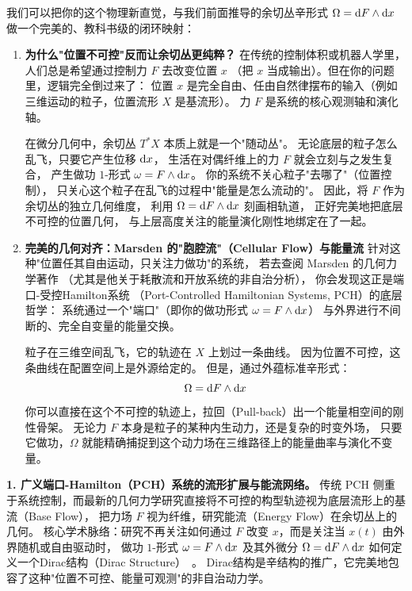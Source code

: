 ﻿\documentclass[10pt,a4paper]{article}
\numberwithin{equation}{section}
\begin{document}
\begin{framed}
我们可以把你的这个物理新直觉，与我们前面推导的余切丛辛形式
$\Omega = \text dF \wedge \text dx$ 做一个完美的、教科书级的闭环映射：

\begin{enumerate}
  \item \textbf{为什么"位置不可控"反而让余切丛更纯粹？}
  在传统的控制体积或机器人学里，人们总是希望通过控制力 $F$ 去改变位置 $x$
  （把 $x$ 当成输出）。但在你的问题里，逻辑完全倒过来了：
  位置 $x$ 是完全自由、任由自然律摆布的输入（例如三维运动的粒子，位置流形 $X$ 是基流形）。
  力 $F$ 是系统的核心观测轴和演化轴。

  在微分几何中，余切丛 $T^*X$ 本质上就是一个"随动丛"。
  无论底层的粒子怎么乱飞，只要它产生位移 $\text dx$，
  生活在对偶纤维上的力 $F$ 就会立刻与之发生复合，
  产生做功 $1$-形式 $\omega = F \wedge \text dx$。
  你的系统不关心粒子"去哪了"（位置控制），
  只关心这个粒子在乱飞的过程中"能量是怎么流动的"。
  因此，将 $F$ 作为余切丛的独立几何维度，
  利用 $\Omega = \text dF \wedge \text dx$ 刻画相轨道，
  正好完美地把底层不可控的位置几何，
  与上层高度关注的能量演化刚性地绑定在了一起。

  \item \textbf{完美的几何对齐：Marsden 的"胞腔流"（Cellular Flow）与能量流}
  针对这种"位置任其自由运动，只关注力做功"的系统，
  若去查阅 Marsden 的几何力学著作
  （尤其是他关于耗散流和开放系统的非自治分析），
  你会发现这正是端口-受控Hamilton系统
  （Port-Controlled Hamiltonian Systems, PCH）的底层哲学：
  系统通过一个"端口"（即你的做功形式 $\omega = F \wedge \text dx$）
  与外界进行不间断的、完全自变量的能量交换。

  粒子在三维空间乱飞，它的轨迹在 $X$ 上划过一条曲线。
  因为位置不可控，这条曲线在配置空间上是外源给定的。
  但是，通过外蕴标准辛形式：
  \begin{equation}
    \Omega = \text dF \wedge \text dx
  \end{equation}
  你可以直接在这个不可控的轨迹上，拉回（Pull-back）出一个能量相空间的刚性骨架。
  无论力 $F$ 本身是粒子的某种内生动力，还是复杂的时变外场，
  只要它做功，$\Omega$ 就能精确捕捉到这个动力场在三维路径上的能量曲率与演化不变量。
\end{enumerate}



\textbf{1. 广义端口-Hamilton（PCH）系统的流形扩展与能流网络。}
传统 PCH 侧重于系统控制，而最新的几何力学研究直接将不可控的构型轨迹视为底层流形上的基流（Base Flow），
把力场 $F$ 视为纤维，研究能流（Energy Flow）在余切丛上的几何。
核心学术脉络：研究不再关注如何通过 $F$ 改变 $x$，而是关注当 $x(t)$ 由外界随机或自由驱动时，
做功 $1$-形式 $\omega = F \wedge \text dx$ 及其外微分 $\Omega = \text dF \wedge \text dx$ 如何定义一个Dirac结构（Dirac Structure）~\cite{Courant1990}。
Dirac结构是辛结构的推广，它完美地包容了这种"位置不可控、能量可观测"的非自治动力学。


\end{framed}
\end{document}

